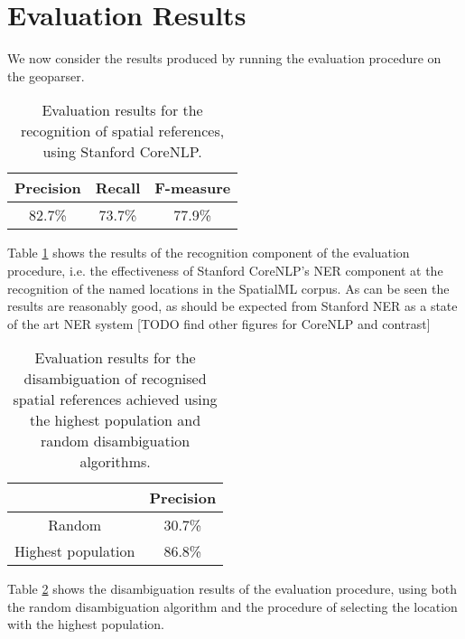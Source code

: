 \documentclass[12pt, a4paper]{report}
\begin{document}
\section{Evaluation Results}
\label{sec:evaluation_results}


We now consider the results produced by running the evaluation procedure on the geoparser. 

\begin{table}[H]
	\centering
	\begin{tabular}{| c | c | c |}
		\hline
		Precision & Recall & F-measure \\ \hline
		82.7\% & 73.7\% & 77.9\% \\ \hline
	\end{tabular}
	\caption{ Evaluation results for the recognition of spatial references, using Stanford CoreNLP. }
	\label{table:recognition}
\end{table}

Table \ref{table:recognition} shows the results of the recognition component of the evaluation procedure, i.e. the effectiveness of Stanford CoreNLP's NER component at the recognition of the named locations in the SpatialML corpus. As can be seen the results are reasonably good, as should be expected from Stanford NER as a state of the art NER system [TODO find other figures for CoreNLP and contrast]

\begin{table}[H]
	\centering
	\begin{tabular}{| c | c |}
		\hline
	    & Precision \\ \hline
		Random & 30.7\% \\ \hline
		Highest population & 86.8\% \\ \hline
	\end{tabular}
	\caption{ Evaluation results for the disambiguation of recognised spatial references achieved using the highest population and random disambiguation algorithms. }
	\label{table:disambiguation}
\end{table}

Table \ref{table:disambiguation} shows the disambiguation results of the evaluation procedure, using both the random disambiguation algorithm and the procedure of selecting the location with the highest population.
\end{document}
